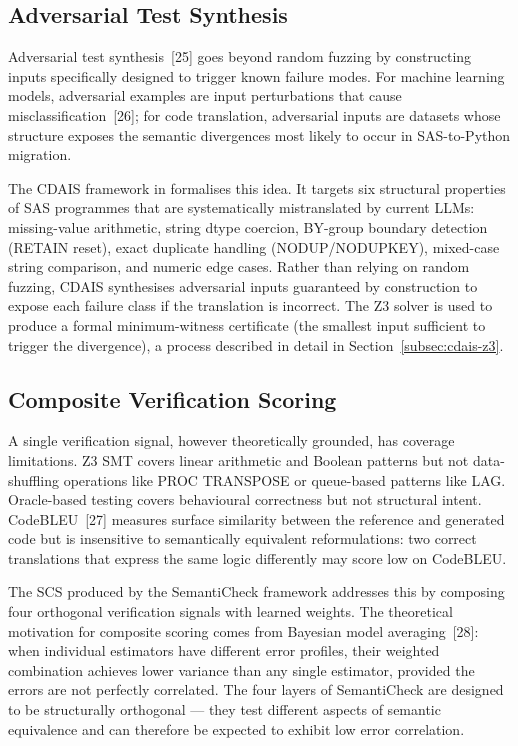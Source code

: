 \subsection{Adversarial Test Synthesis}
\label{subsec:adversarial-synthesis-theory}

Adversarial test synthesis~[25] goes beyond random fuzzing by constructing
inputs specifically designed to trigger known failure modes. For machine
learning models, adversarial examples are input perturbations that cause
misclassification~[26]; for code translation, adversarial inputs are datasets
whose structure exposes the semantic divergences most likely to occur in
SAS-to-Python migration.

The \ac{CDAIS} framework in \codara{} formalises this idea. It targets six
structural properties of SAS programmes that are systematically mistranslated
by current \acp{LLM}: missing-value arithmetic, string dtype coercion, BY-group
boundary detection (RETAIN reset), exact duplicate handling (NODUP/NODUPKEY),
mixed-case string comparison, and numeric edge cases. Rather than relying on
random fuzzing, \ac{CDAIS} synthesises adversarial inputs guaranteed by
construction to expose each failure class if the translation is incorrect.
The Z3 solver is used to produce a formal minimum-witness certificate
(the smallest input sufficient to trigger the divergence), a process described
in detail in Section~\ref{subsec:cdais-z3}.

\subsection{Composite Verification Scoring}
\label{subsec:composite-scoring-theory}

A single verification signal, however theoretically grounded, has coverage
limitations. Z3 \ac{SMT} covers linear arithmetic and Boolean patterns but not
data-shuffling operations like PROC TRANSPOSE or queue-based patterns like LAG.
Oracle-based testing covers behavioural correctness but not structural intent.
CodeBLEU~[27] measures surface similarity between the reference and generated
code but is insensitive to semantically equivalent reformulations: two correct
translations that express the same logic differently may score low on CodeBLEU.

The \ac{SCS} produced by the SemantiCheck framework addresses this by
composing four orthogonal verification signals with learned weights. The
theoretical motivation for composite scoring comes from Bayesian model
averaging~[28]: when individual estimators have different error profiles,
their weighted combination achieves lower variance than any single estimator,
provided the errors are not perfectly correlated. The four layers of
SemantiCheck are designed to be structurally orthogonal --- they test
different aspects of semantic equivalence and can therefore be expected to
exhibit low error correlation.

